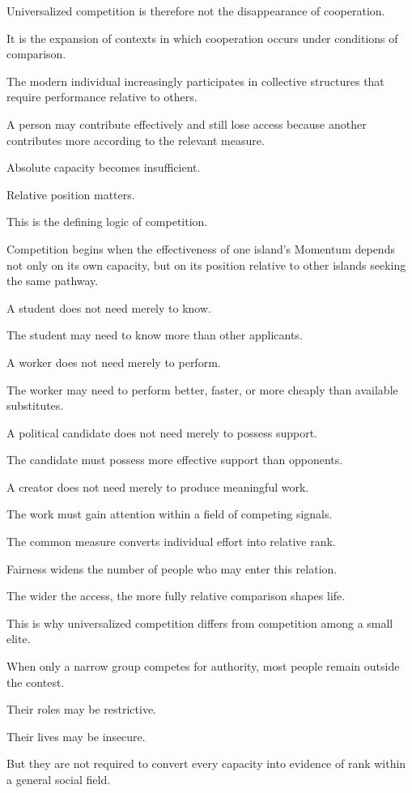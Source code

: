 Universalized competition is therefore not the disappearance of cooperation.

It is the expansion of contexts in which cooperation occurs under conditions of comparison.

The modern individual increasingly participates in collective structures that require performance relative to others.

A person may contribute effectively and still lose access because another contributes more according to the relevant measure.

Absolute capacity becomes insufficient.

Relative position matters.

This is the defining logic of competition.

Competition begins when the effectiveness of one island’s Momentum depends not only on its own capacity, but on its position relative to other islands seeking the same pathway.

A student does not need merely to know.

The student may need to know more than other applicants.

A worker does not need merely to perform.

The worker may need to perform better, faster, or more cheaply than available substitutes.

A political candidate does not need merely to possess support.

The candidate must possess more effective support than opponents.

A creator does not need merely to produce meaningful work.

The work must gain attention within a field of competing signals.

The common measure converts individual effort into relative rank.

Fairness widens the number of people who may enter this relation.

The wider the access, the more fully relative comparison shapes life.

This is why universalized competition differs from competition among a small elite.

When only a narrow group competes for authority, most people remain outside the contest.

Their roles may be restrictive.

Their lives may be insecure.

But they are not required to convert every capacity into evidence of rank within a general social field.


